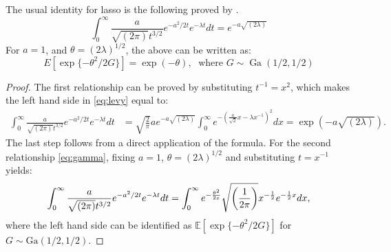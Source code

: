 \documentclass[lineno]{biometrika}
\begin{document}
\begin{remark}
The usual identity for lasso is the following proved by \citet{levy1940certains}.
\begin{equation}
  \int_{0}^{\infty} \frac{a}{\sqrt{(2\pi)} t^{3/2}} e^{-a^2/2t} e^{-\lambda t} dt = e^{-a\sqrt{(2\lambda)}} \label{eq:levy}
\end{equation}
For $a = 1$, and $\theta = (2\lambda)^{1/2}$, the above can be written as: 
\begin{equation}
  E \left[\exp\{-\theta^2/2 G \} \right] = \exp(-\theta), \; \text{ where } G \sim \operatorname{Ga} (1/2, 1/2) \label{eq:gamma}
\end{equation}
\end{remark}
\begin{proof}
The first relationship can be proved by substituting $t^{-1} = x^2$, which makes the left hand side in \eqref{eq:levy} equal to: 
\begin{align*}
\int_{0}^{\infty} \frac{a}{\sqrt{(2\pi)} t^{3/2}} e^{-a^2/2t} e^{-\lambda t} dt & = \sqrt{\frac{2}{\pi}} a e^{-a\sqrt{(2\lambda)}} \int_0^{\infty} e^{-\left(\frac{a}{\sqrt{2}} x - \lambda x^{-1}\right)^2} dx = \exp(-a\sqrt{(2\lambda)}).
\end{align*}
The last step follows from a direct application of the \CS formula. For the second relationship \eqref{eq:gamma}, fixing $a = 1$, $\theta = (2\lambda)^{1/2}$ and substituting $t = x^{-1}$ yields: 
$$
\int_{0}^{\infty} \frac{a}{\sqrt{(2\pi)} t^{3/2}} e^{-a^2/2t} e^{-\lambda t} dt = \int_{0}^{\infty} e^{-\frac{\theta^2}{2x}} \sqrt{\left(\frac{1}{2\pi}\right)} x^{-\frac{1}{2}} e^{-\frac{1}{2} x} dx, 
$$
where the left hand side can be identified as $\mathbb{E} \left[\exp\{-\theta^2/2 G \} \right]$ for $G \sim \mbox{Ga}(1/2,1/2)$. %
\end{proof}
\end{document}
